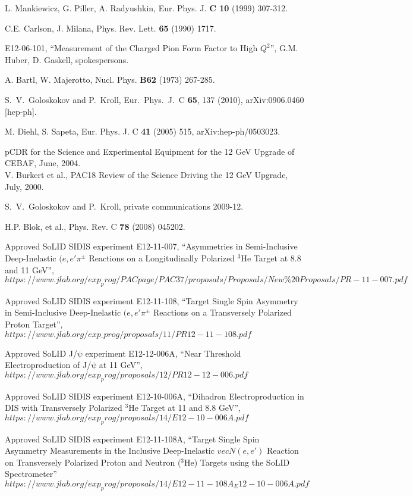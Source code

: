 \begin{thebibliography}{}
 L. Mankiewicz, G. Piller, A. Radyushkin, Eur. Phys. J. {\bf C
    10} (1999) 307-312.

 C.E. Carlson, J. Milana, Phys. Rev. Lett. {\bf 65} (1990) 1717.

 E12-06-101, ``Measurement of the Charged Pion Form Factor to
  High $Q^2$'', G.M. Huber, D. Gaskell, spokespersons.

 A. Bartl, W. Majerotto, Nucl. Phys. {\bf B62} (1973) 267-285.

 S.~V.~Goloskokov and P.~Kroll, Eur.\ Phys.\ J.\ C {\bf 65},
  137 (2010), arXiv:0906.0460 [hep-ph].

 M. Diehl, S. Sapeta, Eur. Phys. J. C {\bf 41} (2005) 515,
  arXiv:hep-ph/0503023.

 pCDR for the Science and Experimental Equipment for the 12 GeV
  Upgrade of CEBAF, June, 2004.\\
V. Burkert et al., PAC18 Review of the Science Driving the 12 GeV Upgrade, 
  July, 2000.

 S.~V.~Goloskokov and P.~Kroll, private communications 2009-12.

 H.P. Blok, et al., Phys. Rev. C {\bf 78} (2008) 045202.

  Approved SoLID SIDIS experiment E12-11-007,
``Asymmetries in Semi-Inclusive Deep-Inelastic  $(e,e'\pi^{\pm}$ Reactions on a
Longitudinally Polarized $\mathrm{^{3}He}$ Target at 8.8 and 11 GeV'',
$https://www.jlab.org/exp_prog/PACpage/PAC37/proposals/Proposals/New\%20Proposals/PR-11-007.pdf$

  Approved SoLID SIDIS experiment E12-11-108,
``Target Single Spin Asymmetry in Semi-Inclusive Deep-Inelastic
$(e,e'\pi^{\pm}$ Reactions on a Transversely Polarized Proton Target'',
$https://www.jlab.org/exp\_prog/proposals/11/PR12-11-108.pdf$

  Approved SoLID J/$\mathrm{\psi}$ experiment E12-12-006A,
  ``Near Threshold Electroproduction of J/$\mathrm{\psi}$ at 11 GeV'',
$https://www.jlab.org/exp_prog/proposals/12/PR12-12-006.pdf$

  Approved SoLID SIDIS experiment E12-10-006A,
  ``Dihadron Electroproduction in DIS with  Transversely Polarized
  $\mathrm{^{3}He}$ Target at 11 and 8.8 GeV'',
$https://www.jlab.org/exp_prog/proposals/14/E12-10-006A.pdf$

   Approved SoLID SIDIS experiment E12-11-108A,
``Target Single Spin Asymmetry Measurements in the Inclusive Deep-Inelastic
$vec{N}(e,e')$ Reaction on Transversely Polarized Proton and Neutron
($\mathrm{^{3}He}$) Targets using the SoLID Spectrometer''
$https://www.jlab.org/exp_prog/proposals/14/E12-11-108A_E12-10-006A.pdf$


\end{thebibliography}
